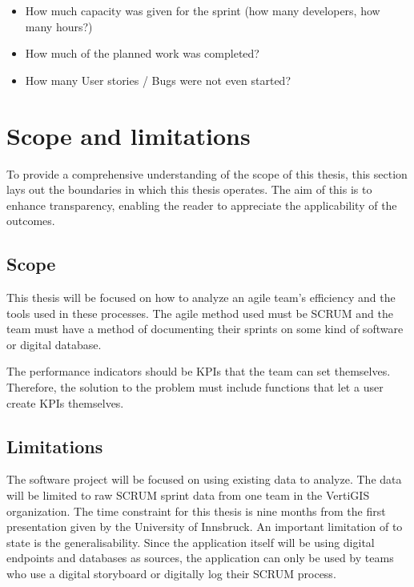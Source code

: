 \begin{itemize}
    \item How much capacity was given for the sprint (how many developers, how many hours?)
    \item How much of the planned work was completed?
    \item How many User stories / Bugs were not even started?
\end{itemize}

\section{Scope and limitations}

To provide a comprehensive understanding of the scope of this thesis, 
this section lays out the boundaries in which this thesis operates. 
The aim of this is to enhance transparency, enabling the reader to appreciate the applicability of the outcomes.

\subsection{Scope}

This thesis will be focused on how to analyze an agile team's efficiency and the tools used in these processes. 
The agile method used must be SCRUM and the team must have a method of documenting 
their sprints on some kind of software or digital database. 

The performance indicators should be KPIs that the team can set themselves. 
Therefore, the solution to the problem must include functions that let a user create KPIs themselves.

\subsection{Limitations}

The software project will be focused on using existing data to analyze. 
The data will be limited to raw SCRUM sprint data from one team in the VertiGIS organization.
The time constraint for this thesis is nine months from the first presentation given by the University of Innsbruck. 
An important limitation of to state is the generalisability. Since the application itself will be using digital endpoints 
and databases as sources, the application can only be used by teams who use a digital storyboard or digitally log their SCRUM process.
